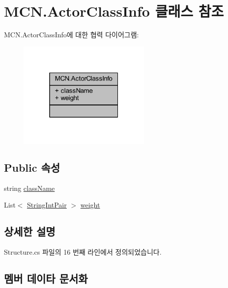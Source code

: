 \hypertarget{class_m_c_n_1_1_actor_class_info}{}\section{M\+C\+N.\+Actor\+Class\+Info 클래스 참조}
\label{class_m_c_n_1_1_actor_class_info}


M\+C\+N.\+Actor\+Class\+Info에 대한 협력 다이어그램\+:\nopagebreak
\begin{figure}[H]
\begin{center}
\leavevmode
\includegraphics[width=184pt]{class_m_c_n_1_1_actor_class_info__coll__graph}
\end{center}
\end{figure}
\subsection*{Public 속성}
\begin{DoxyCompactItemize}
\item 
string \hyperlink{class_m_c_n_1_1_actor_class_info_ae6514ccfb1a131c047d28a612b2e5d7c}{class\+Name}
\item 
List$<$ \hyperlink{class_m_c_n_1_1_string_int_pair}{String\+Int\+Pair} $>$ \hyperlink{class_m_c_n_1_1_actor_class_info_a65c5ae85a99cc8058149fb567f7c0086}{weight}
\end{DoxyCompactItemize}


\subsection{상세한 설명}


Structure.\+cs 파일의 16 번째 라인에서 정의되었습니다.



\subsection{멤버 데이타 문서화}
